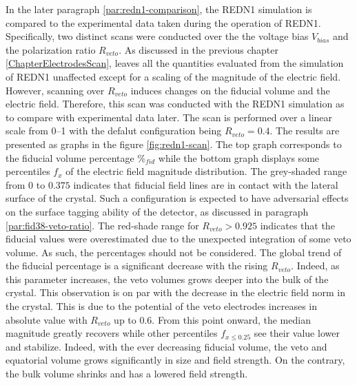 In the later paragraph \ref{par:redn1-comparison}, the REDN1 simulation is compared to the experimental data taken during the operation of REDN1. Specifically, two distinct scans were conducted over the the voltage bias $V_{bias}$ and the polarization ratio $R_{veto}$. As discussed in the previous chapter \ref{ChapterElectrodesScan}, leaves all the quantities evaluated from the simulation of REDN1 unaffected except for a scaling of the magnitude of the electric field.
However, scanning over $R_{veto}$ induces changes on the fiducial volume and the electric field. Therefore, this scan was conducted with the REDN1 simulation as to compare with experimental data later. The scan is performed over a linear scale from \SIrange{0}{1}{} with the defalut configuration being $R_{veto} = 0.4$. The results are presented as graphs in the figure \ref{fig:redn1-scan}. The top graph corresponds to the fiducial volume percentage $\%_{fid}$ while the bottom graph displays some percentiles $f_x$ of the electric field magnitude distribution. 
The grey-shaded range from $0$ to $0.375$ indicates that fiducial field lines are in contact with the lateral surface of the crystal. Such a configuration is expected to have adversarial effects on the surface tagging ability of the detector, as discussed in paragraph \ref{par:fid38-veto-ratio}.
The red-shade range for $R_{veto} > 0.925$ indicates that the fiducial values were overestimated due to the unexpected integration of some veto volume. As such, the percentages should not be considered.
The global trend of the fiducial percentage is a significant decrease with the rising $R_{veto}$. Indeed, as this parameter increases, the veto volumes grows deeper into the bulk of the crystal. This observation is on par with the decrease in the electric field norm in the crystal. This is due to the potential of the veto electrodes increases in absolute value with $R_{veto}$ up to $0.6$. From this point onward, the median magnitude greatly recovers while other percentiles $f_{x \leq 0.25}$ see their value lower and stabilize. Indeed, with the ever decreasing fiducial volume, the veto and equatorial volume grows significantly in size and field strength. On the contrary, the bulk volume shrinks and has a lowered field strength.

